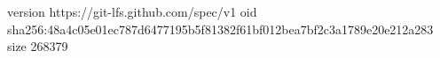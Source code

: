 version https://git-lfs.github.com/spec/v1
oid sha256:48a4c05e01ec787d6477195b5f81382f61bf012bea7bf2c3a1789e20e212a283
size 268379
